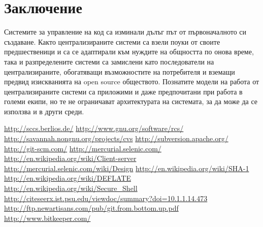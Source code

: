 \documentclass[a4paper]{article}
\begin{document}
\section{Заключение}

  Системите за управление на код са изминали дълъг път от първоначалното си
  създаване. Както централизираните системи са взели поуки от своите
  предшественици и са се адаптирали към нуждите на общността по онова време,
  така и разпределените системи са замислени като последователи на
  централизираните, обогатяващи възможностите на потребителя и вземащи предвид
  изискванията на open source обществото. Познатите модели на работа от
  централизираните системи са приложими и даже предпочитани при работа в големи
  екипи, но те не ограничават архитектурата на системата, за да може да се
  използва и в други среди.

\newpage

\begin{thebibliography}{99}
   \url{http://sccs.berlios.de/}
   \url{http://www.gnu.org/software/rcs/}
   \url{http://savannah.nongnu.org/projects/cvs}
   \url{http://subversion.apache.org/}
   \url{http://git-scm.com/}
   \url{http://mercurial.selenic.com/}
   \url{http://en.wikipedia.org/wiki/Client-server}
   \url{http://mercurial.selenic.com/wiki/Design}
   \url{http://en.wikipedia.org/wiki/SHA-1}
   \url{http://en.wikipedia.org/wiki/DEFLATE}
   \url{http://en.wikipedia.org/wiki/Secure\_Shell}
   \url{http://citeseerx.ist.psu.edu/viewdoc/summary?doi=10.1.1.14.473}
   \url{http://ftp.newartisans.com/pub/git.from.bottom.up.pdf}
   \url{http://www.bitkeeper.com/}
\end{thebibliography}
\end{document}
